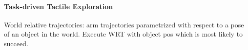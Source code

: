 \documentclass[review]{elsarticle}
\begin{document}
\paragraph{Task-driven Tactile Exploration}
  
World relative trajectories: arm trajectories parametrized with respect to a pose of an object in the world.
Execute WRT with object pos which is most likely to succeed. 
  
\cite{Hsiao_RSS_10} %




%  


 

\end{document}
